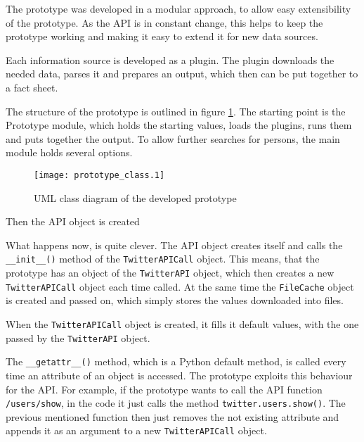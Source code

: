 The prototype was developed in a modular approach, to allow easy extensibility
of the prototype. As the \Twitter{} API is in constant change, this helps to
keep the prototype working and making it easy to extend it for new data
sources.

Each information source is developed as a plugin. The plugin downloads the
needed data, parses it and prepares an output, which then can be put together
to a fact sheet.

The structure of the prototype is outlined in figure \ref{fig:prototype_class}.
The starting point is the Prototype module, which holds the starting values,
loads the plugins, runs them and puts together the output. To allow further
searches for persons, the main module holds several options.

\begin{figure}[ht]
  \begin{center}
    \texttt{[image: prototype\_class.1]}
    \label{fig:prototype_class}
    \caption{UML class diagram of the developed prototype}
  \end{center}
\end{figure}

\lstset{language=python}

Then the API object is created

What happens now, is quite clever. The API object creates itself and calls the
\texttt{\_\_init\_\_()} method of the \texttt{TwitterAPICall} object. This means,
that the prototype has an object of the \texttt{TwitterAPI} object, which then
creates a new \texttt{TwitterAPICall} object each time called. At the same time
the \texttt{FileCache} object is created and passed on, which simply stores the
values downloaded into files.

When the \texttt{TwitterAPICall} object is created, it fills it default values,
with the one passed by the \texttt{TwitterAPI} object.

The \texttt{\_\_getattr\_\_()} method, which is a Python default method, is
called every time an attribute of an object is accessed. The prototype exploits
this behaviour for the \Twitter{} API. For example, if the prototype wants to
call the API function \texttt{/users/show}, in the code it just calls the
method \texttt{twitter.users.show()}. The previous mentioned function then just
removes the not existing attribute and appends it as an argument to a new
\texttt{TwitterAPICall} object.

